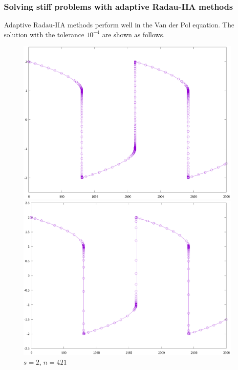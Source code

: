 \documentclass[9pt]{beamer}
\begin{document}
\begin{frame}
  \frametitle{Solving stiff problems with adaptive Radau-IIA methods}
  Adaptive Radau-IIA methods perform well in the Van der Pol equation. The solution with the tolerance $10^{-4}$ are shown as follows.

\begin{figure}[H]
  \centering
  \begin{minipage}[t]{0.32\linewidth}
      \centering
      \includegraphics[width=0.95\linewidth]{pic/9-6.eps}
      \vspace{-1em}
      \caption{\small $s=2$, $n=421$}
  \end{minipage}
  \begin{minipage}[t]{0.32\linewidth}
      \centering
      \includegraphics[width=0.95\linewidth]{pic/9-7.eps}
      \vspace{-1em}

\end{minipage}
\end{figure}
\end{frame}
\end{document}
